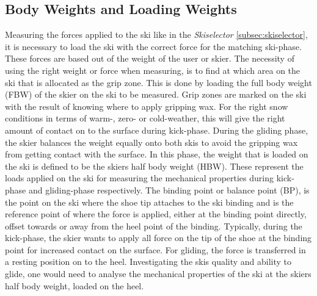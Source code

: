 \subsection{Body Weights and Loading Weights}
\label{subsec:bw}
Measuring the forces applied to the ski like in the \textit{Skiselector} \ref{subsec:skiselector}, it is necessary to load the ski with the correct force for the matching ski-phase. These forces are based out of the weight of the user or skier. The necessity of using the right weight or force when measuring, is to find at which area on the ski that is allocated as the grip zone. This is done by loading the full body weight (FBW) of the skier on the ski to be measured. Grip zones are marked on the ski with the result of knowing where to apply gripping wax. For the right snow conditions in terms of warm-, zero- or cold-weather, this will give the right amount of contact on to the surface during kick-phase.
During the gliding phase, the skier balances the weight equally onto both skis to avoid the gripping wax from getting contact with the surface. In this phase, the weight that is loaded on the ski is defined to be the skiers half body weight (HBW).
These represent the loads applied on the ski for measuring the mechanical properties during kick-phase and gliding-phase respectively. The binding point or balance point (BP), is the point on the ski where the shoe tip attaches to the ski binding and is the reference point of where the force is applied, either at the binding point directly, offset towards or away from the heel point of the binding. Typically, during the kick-phase, the skier wants to apply all force on the tip of the shoe at the binding point for increased contact on the surface. For gliding, the force is transferred in a resting position on to the heel. Investigating the skis quality and ability to glide, one would need to analyse the mechanical properties of the ski at the skiers half body weight, loaded on the heel.

